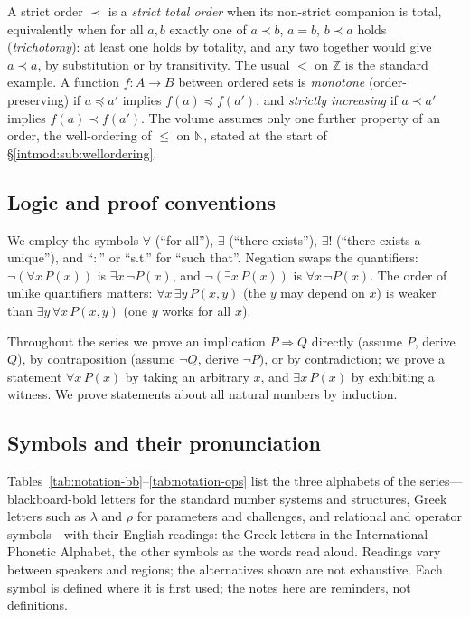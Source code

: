 \documentclass[11pt,a4paper]{article}
\theoremstyle{definition}
\theoremstyle{remark}
\newcommand{\N}{\ensuremath{\mathbb{N}}}
\newcommand{\Z}{\ensuremath{\mathbb{Z}}}
\begin{document}
A strict order \(\prec\) is a \emph{strict total order} when its non-strict
companion is total, equivalently when for all \(a, b\) exactly one of
\(a \prec b\), \(a = b\), \(b \prec a\) holds (\emph{trichotomy}): at least
one holds by totality, and any two together would give \(a \prec a\), by
substitution or by transitivity. The usual \(<\) on \(\Z\) is the standard
example. A function \(f \colon A \to B\) between ordered sets is
\emph{monotone} (order-preserving) if \(a \preceq a'\) implies
\(f(a) \preceq f(a')\), and \emph{strictly increasing} if \(a \prec a'\)
implies \(f(a) \prec f(a')\). The volume assumes only one further property
of an order, the well-ordering of \(\le\) on \(\N\), stated at the start of
\S\ref{intmod:sub:wellordering}.

\subsection{Logic and proof conventions}\label{sets:subsec:logic}
We employ the symbols \(\forall\) (``for all''), \(\exists\) (``there
exists''), \(\exists!\) (``there exists a unique''), and ``\(\colon\)'' or
``s.t.'' for ``such that''. Negation swaps the quantifiers:
\(\neg(\forall x\, P(x))\) is \(\exists x\,\neg P(x)\), and
\(\neg(\exists x\, P(x))\) is \(\forall x\,\neg P(x)\). The order of unlike
quantifiers matters: \(\forall x\,\exists y\,P(x,y)\) (the \(y\) may depend
on \(x\)) is weaker than \(\exists y\,\forall x\,P(x,y)\) (one \(y\) works
for all \(x\)).

Throughout the series we prove an implication \(P \Rightarrow Q\) directly
(assume \(P\), derive \(Q\)), by contraposition (assume \(\neg Q\), derive
\(\neg P\)), or by contradiction; we prove a statement \(\forall x\,P(x)\) by
taking an arbitrary \(x\), and \(\exists x\,P(x)\) by exhibiting a witness.
We prove statements about all natural numbers by induction.

\subsection{Symbols and their pronunciation}\label{sets:subsec:pronounce}
Tables~\ref{tab:notation-bb}--\ref{tab:notation-ops} list the three
alphabets of the series---blackboard-bold letters for the standard number
systems and structures, Greek letters such as \(\lambda\) and \(\rho\) for
parameters and challenges, and relational and operator symbols---with their
English readings: the Greek letters in the International Phonetic Alphabet,
the other symbols as the words read aloud. Readings vary between speakers and
regions; the alternatives shown are not exhaustive.
Each symbol is defined where it is first used; the notes here are
reminders, not definitions.
\end{document}
